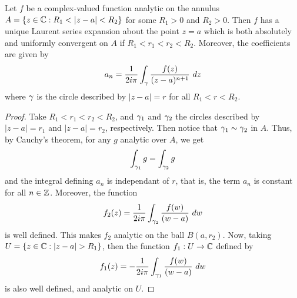 \begin{theorem}\label{5.1.3}
    Let $f$ be a complex-valued function analytic on the annulus  $A=\{z \in \C :
    R_1<|z-a|<R_2\}$ for some $R_1>0$ and $R_2>0$. Then $f$ has a unique Laurent
    series expansion about the point  $z=a$ which is both absolutely and
    uniformly convergent on $A$ if  $R_1<r_1<r_2<R_2$. Moreover, the
    coefficients are given by
    \begin{equation*}
        a_n=\frac{1}{2i\pi}\int_{\gamma}{\frac{f(z)}{(z-a)^{n+1}} \ dz}
    \end{equation*}
    where $\gamma$ is the circle described by  $|z-a|=r$ for all  $R_1<r<R_2$.
\end{theorem}
\begin{proof}
    Take $R_1<r_1<r_2<R_2$, and $\gamma_1$ and $\gamma_2$ the circles described by
    $|z-a|=r_1$ and $|z-a|=r_2$, respectively. Then notice that $\gamma_1 \sim \gamma_2$
    in $A$. Thus, by Cauchy's theorem, for any  $g$ analytic over  $A$, we get
    \begin{equation*}
        \int_{\gamma_1}{g}=\int_{\gamma_2}{g}
    \end{equation*}
    and the integral defining $a_n$ is independant of  $r$, that is, the term
    $a_n$ is constant for all $n \in \mathbb{Z}$. Moreover, the function
    \begin{equation*}
        f_2(z)=\frac{1}{2i\pi}\int_{\gamma_2}{\frac{f(w)}{(w-a)} \ dw}
    \end{equation*}
    is well defined. This makes $f_2$ analytic on the ball $B(a,r_2)$. Now,
    taking $U=\{z \in \C : |z-a|>R_1\}$, then the function $f_1:U \xrightarrow{}
    \mathbb{C}$ defined by
    \begin{equation*}
        f_1(z)=-\frac{1}{2i\pi}\int_{\gamma_1}{\frac{f(w)}{(w-a)} \ dw}
    \end{equation*}
    is also well defined, and analytic on $U$.


\end{proof}

